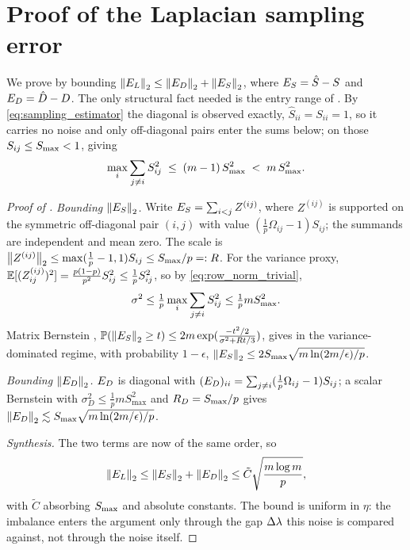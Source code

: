 \section{Proof of the Laplacian sampling error}\label{app:comp2}

We prove  by bounding
$\left\lVert E_{L} \right\rVert_{2}\le\left\lVert E_{D} \right\rVert_{2}+\left\lVert E_{S} \right\rVert_{2}$, where $E_{S}=\hat S-S$ and
$E_{D}=\hat D-D$. The only structural fact needed is the entry range of
. By \eqref{eq:sampling_estimator} the diagonal is observed exactly,
$\hat S_{ii}=S_{ii}=1$, so it carries no noise and only off-diagonal pairs enter the
sums below; on those $S_{ij}\le S_{\max}<1$, giving
\begin{equation}\label{eq:row_norm_trivial}
   \max_i\sum_{j\ne i}S_{ij}^2\;\le\;(m-1)\,S_{\max}^2\;<\;m\,S_{\max}^2 .
\end{equation}

\begin{proof}[Proof of ]
\emph{Bounding $\left\lVert E_{S} \right\rVert_{2}$.} Write $E_{S}=\sum_{i<j}Z^{(ij)}$, where $Z^{(ij)}$
is supported on the symmetric off-diagonal pair $(i,j)$ with value
$(\tfrac1p\Omega_{ij}-1)S_{ij}$;
the summands are independent and mean zero. The scale is
$\left\lVert Z^{(ij)} \right\rVert_{2}\le\max(\tfrac1p-1,1)S_{ij}\le S_{\max}/p=:R$. For the variance proxy,
$\mathbb{E}[(Z^{(ij)}_{ij})^2]=\tfrac{p(1-p)}{p^2}S_{ij}^2\le\tfrac1pS_{ij}^2$, so by
\eqref{eq:row_norm_trivial},
\[
   \sigma^2\le\tfrac1p\max_i\sum_{j\ne i}S_{ij}^2\le\tfrac1p mS_{\max}^2 .
\]
Matrix Bernstein \cite{tropp2012userfriendly},
$\mathbb{P}(\left\lVert E_{S} \right\rVert_{2}\ge t)\le2m\exp(\tfrac{-t^2/2}{\sigma^2+Rt/3})$, gives in the
variance-dominated regime, with probability $1-\epsilon$,
$\left\lVert E_{S} \right\rVert_{2}\le2S_{\max}\sqrt{m\ln(2m/\epsilon)/p}$.

\emph{Bounding $\left\lVert E_{D} \right\rVert_{2}$.} $E_{D}$ is diagonal with
$(E_{D})_{ii}=\sum_{j\ne i}(\tfrac1p\Omega_{ij}-1)S_{ij}$; a scalar Bernstein with
$\sigma_D^2\le\tfrac1p mS_{\max}^2$ and $R_D=S_{\max}/p$ gives
$\left\lVert E_{D} \right\rVert_{2}\lesssim S_{\max}\sqrt{m\ln(2m/\epsilon)/p}$.

\emph{Synthesis.} The two terms are now of the same order, so
\[
   \left\lVert E_{L} \right\rVert_{2}\le\left\lVert E_{S} \right\rVert_{2}+\left\lVert E_{D} \right\rVert_{2}\le\tilde C\sqrt{\frac{m\log m}{p}},
\]
with $\tilde C$ absorbing $S_{\max}$ and absolute constants. The bound is uniform in
$\eta$: the imbalance enters the argument only through the gap $\Delta\lambda$ this noise
is compared against, not through the noise itself.
\end{proof}
